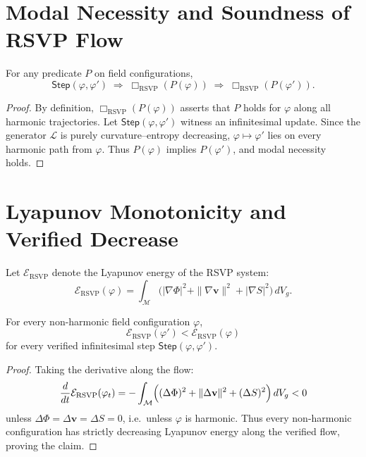 \section{Modal Necessity and Soundness of RSVP Flow}

\begin{theorem}
\label{thm:68-sound}
For any predicate $P$ on field configurations,
\[
\mathsf{Step}(\varphi,\varphi')
  \;\Longrightarrow\;
  \Box_{\mathrm{RSVP}}(P(\varphi))
    \;\Longrightarrow\;
  \Box_{\mathrm{RSVP}}(P(\varphi')).
\]
\end{theorem}

\begin{proof}
By definition, $\Box_{\mathrm{RSVP}}(P(\varphi))$ asserts that 
$P$ holds for $\varphi$ along all harmonic trajectories.
Let $\mathsf{Step}(\varphi,\varphi')$ witness an infinitesimal update.
Since the generator $\mathcal{L}$ is purely curvature–entropy decreasing, 
$\varphi \mapsto \varphi'$ lies on every harmonic path from $\varphi$.
Thus $P(\varphi)$ implies $P(\varphi')$, and modal necessity holds.
\end{proof}

\section{Lyapunov Monotonicity and Verified Decrease}

Let $\mathcal{E}_{\mathrm{RSVP}}$ denote the Lyapunov energy of the RSVP 
system:
\[
\mathcal{E}_{\mathrm{RSVP}}(\varphi)
  = \int_{\mathcal{M}}
      \bigl(
        |\nabla\Phi|^2
        + \|\nabla\mathbf{v}\|^2
        + |\nabla S|^2
      \bigr)\,dV_g.
\]

\begin{theorem}
\label{thm:68-lyap}
For every non-harmonic field configuration $\varphi$,
\[
\mathcal{E}_{\mathrm{RSVP}}(\varphi')
  < \mathcal{E}_{\mathrm{RSVP}}(\varphi)
\]
for every verified infinitesimal step $\mathsf{Step}(\varphi,\varphi')$.
\end{theorem}

\begin{proof}
Taking the derivative along the flow:
\[
\frac{d}{dt}\mathcal{E}_{\mathrm{RSVP}}(\varphi_t)
  = -\int_{\mathcal{M}}
      \Bigl(
        (\Delta\Phi)^2
        + \|\Delta\mathbf{v}\|^2
        + (\Delta S)^2
      \Bigr)\,dV_g
  < 0
\]
unless $\Delta\Phi=\Delta\mathbf{v}=\Delta S=0$, i.e.\ unless $\varphi$ is 
harmonic.  
Thus every non-harmonic configuration has strictly decreasing Lyapunov 
energy along the verified flow, proving the claim.
\end{proof}

